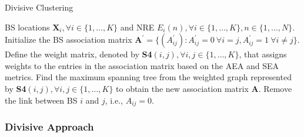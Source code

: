 \documentclass[10pt, letter,twocolumn]{IEEEtran}
\begin{document}
\begin{algorithm}[t]
\small
\renewcommand{\thealgorithm}{2}
\caption{Divisive Clustering}
\label{divisive_algorithm}
\begin{algorithmic}[1]
\Require BS locations $\mathbf{X}_{i}, \forall i \in \{1,\ldots,K\}$ and NRE $E_{i}(n), \forall i \in \{1,\ldots,K\}, n \in \{1,\ldots,N\}$.
\State Initialize the BS association matrix $\mathbf{A}^{\prime} = \{ (A^{\prime}_{ij}) : A^{\prime}_{ij} = 0 \ \forall i = j, A^{\prime}_{ij} = 1 \ \forall i \neq j\}$.
\State Define the weight matrix, denoted by \textbf{S4}$(i,j), \forall i,j \in \{1,\ldots,K\}$, that assigns weights to the entries in the association matrix based on the AEA and SEA metrics.
\State Find the maximum spanning tree from the weighted graph represented by \textbf{S4}$(i,j), \forall i,j \in \{1,\ldots,K\}$ to obtain the new association matrix $\mathbf{A}$.
\State Remove the link between BS $i$ and $j$, i.e., $A_{ij} = 0$.
\EndIf
\EndFor
\end{algorithmic}
\end{algorithm}


\subsubsection{Divisive Approach}
\end{document}
